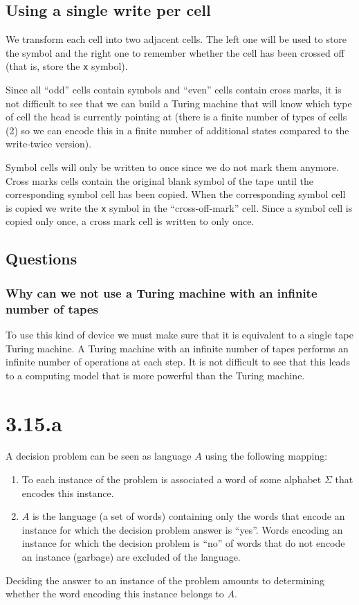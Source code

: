 \documentclass{article}
\begin{document}
\subsection*{Using a single write per cell}

We transform each cell into two adjacent cells. The left one will be used to
store the symbol and the right one to remember whether the cell has been
crossed off (that is, store the \texttt{x} symbol).

Since all ``odd'' cells contain symbols and ``even'' cells contain cross marks,
it is not difficult to see that we can build a Turing machine that will know
which type of cell the head is currently pointing at (there is a finite number
of types of cells (2) so we can encode this in a finite number of additional
states compared to the write-twice version).

Symbol cells will only be written to once since we do not mark them anymore.
Cross marks cells contain the original blank symbol of the tape until the
corresponding symbol cell has been copied. When the corresponding symbol cell
is copied we write the \texttt{x} symbol in the ``cross-off-mark'' cell. Since a symbol
cell is copied only once, a cross mark cell is written to only once.


\subsection*{Questions}
\subsubsection{Why can we not use a Turing machine with an infinite number of
tapes}
To use this kind of device we must make sure that it is equivalent to a single
tape Turing machine.
A Turing machine with an infinite number of tapes performs an infinite number
of operations at each step. It is not difficult to see that this leads to a
computing model that is more powerful than the Turing machine.

\section*{3.15.a}
A decision problem can be seen as language \(A\) using the following mapping:
\begin{enumerate}
	\item To each instance of the problem is associated a word of some alphabet
		\(\Sigma\) that encodes this instance.
	\item \(A\) is the language (a set of words) containing only
		the words that encode an instance for
		which the decision problem answer is ``yes''. Words encoding an
		instance for which the decision problem is ``no'' of words that do not
		encode an instance (garbage) are excluded of the language.
\end{enumerate}
Deciding the answer to an instance of the problem amounts to determining
whether the word encoding this instance belongs to \(A\).
\end{document}
